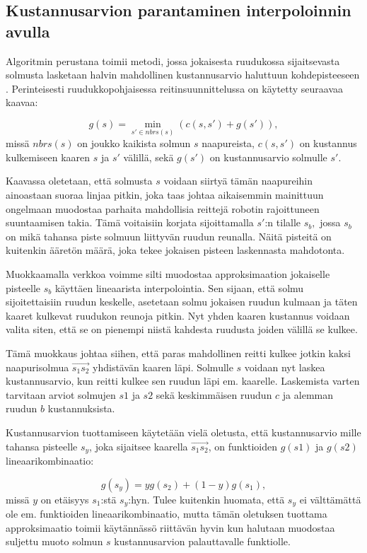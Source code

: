 \documentclass[finnish]{tktltiki2}
\theoremstyle{definition}
\theoremstyle{remark}
\begin{document}
\subsection{Kustannusarvion parantaminen interpoloinnin avulla}
Algoritmin perustana toimii metodi, jossa jokaisesta ruudukossa sijaitsevasta solmusta lasketaan halvin mahdollinen kustannusarvio haluttuun kohdepisteeseen \cite{ferguson2007field}. Perinteisesti ruudukkopohjaisessa reitinsuunnittelussa on käytetty seuraavaa kaavaa:

\[g(s) = \min_{s'\in nbrs(s)} (c(s, s') +g(s')),\]
missä \(nbrs(s)\) on joukko kaikista solmun \(s\) naapureista, \(c(s,s')\) on kustannus kulkemiseen kaaren \(s\) ja \(s'\) välillä, sekä \(g(s')\) on kustannusarvio solmulle \(s'\).

Kaavassa oletetaan, että solmusta \(s\) voidaan siirtyä tämän naapureihin ainoastaan suoraa linjaa pitkin, joka taas johtaa aikaisemmin mainittuun ongelmaan muodostaa parhaita mahdollisia reittejä robotin rajoittuneen suuntaamisen takia. Tämä voitaisiin korjata sijoittamalla \(s'\):n tilalle \(s_b,\) jossa \(s_b\) on mikä tahansa piste solmuun liittyvän ruudun reunalla. Näitä pisteitä on kuitenkin ääretön määrä, joka tekee jokaisen pisteen laskennasta mahdotonta.

Muokkaamalla verkkoa voimme silti muodostaa approksimaation jokaiselle pisteelle \(s_b\) käyttäen lineaarista interpolointia. Sen sijaan, että solmu sijoitettaisiin ruudun keskelle, asetetaan solmu jokaisen ruudun kulmaan ja täten kaaret kulkevat ruudukon reunoja pitkin. Nyt yhden kaaren kustannus voidaan valita siten, että se on pienempi niistä kahdesta ruudusta joiden välillä se kulkee.

Tämä muokkaus johtaa siihen, että paras mahdollinen reitti kulkee jotkin kaksi naapurisolmua $\overrightarrow{s_1s_2}$ yhdistävän kaaren läpi. Solmulle \(s\) voidaan nyt laskea kustannusarvio, kun reitti kulkee sen ruudun läpi em. kaarelle. Laskemista varten tarvitaan arviot solmujen \(s1\) ja \(s2\) sekä keskimmäisen ruudun \(c\) ja alemman ruudun \(b\) kustannuksista.

Kustannusarvion tuottamiseen käytetään vielä oletusta, että kustannusarvio mille tahansa pisteelle \(s_y\), joka sijaitsee kaarella $\overrightarrow{s_1s_2}$, on funktioiden \(g(s1)\) ja \(g(s2)\) lineaarikombinaatio:

\[g(s_y) = yg(s_2)+(1-y)g(s_1),\]
missä \(y\) on etäisyys \(s_1\):stä \(s_y\):hyn. Tulee kuitenkin huomata, että \(s_y\) ei välttämättä ole em. funktioiden lineaarikombinaatio, mutta tämän oletuksen tuottama approksimaatio toimii käytännässö riittävän hyvin kun halutaan muodostaa suljettu muoto solmun \(s\) kustannusarvion palauttavalle funktiolle.
\end{document}
